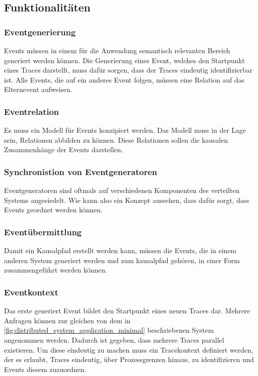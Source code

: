 \subsection{Funktionalitäten}

\subsubsection{Eventgenerierung}
\label{subsubsection:Eventgenerierung}
Events müssen in einem für die Anwendung semantisch relevanten Bereich generiert werden können. Die Generierung eines Event, welches den Startpunkt eines Traces darstellt, muss dafür sorgen, dass der Traces eindeutig identifizierbar ist. Alle Events, die auf ein anderes Event folgen, müssen eine Relation auf das Elternevent aufweisen.

\subsubsection{Eventrelation}
\label{subsubsection:Eventkorrelation}
Es muss ein Modell für Events konzipiert werden. Das Modell muss in der Lage sein, Relationen abbilden zu können. Diese Relationen sollen die kausalen Zusammenhänge der Events darstellen. 

\subsubsection{Synchronistion von Eventgeneratoren}
\label{subsubsection:Synchronistion von Eventgeneratoren}
Eventgeneratoren sind oftmals auf verschiedenen Komponenten des verteilten Systems angesiedelt. Wie kann also ein Konzept aussehen, dass dafür sorgt, dass Events geordnet werden können.

\subsubsection{Eventübermittlung}
\label{subsubsection:Eventübermittlung}
Damit ein Kausalpfad erstellt werden kann, müssen die Events, die in einem anderen System generiert werden und zum kausalpfad gehören, in einer Form zusammengeführt werden können.

\subsubsection{Eventkontext}
\label{subsubsection:Eventkontext}
Das erste generiert Event bildet den Startpunkt eines neuen Traces dar. Mehrere Anfragen können zur gleichen von dem in \cref{fig:distributed_system_application_minimal} beschriebenen System angenommen werden. Dadurch ist gegeben, dass mehrere Traces parallel existieren. Um diese eindeutig zu machen muss ein Tracekontext definiert werden, der es erlaubt, Traces eindeutig, über Prozessgrenzen hinaus, zu identifizieren und Events diesem zuzuordnen.


